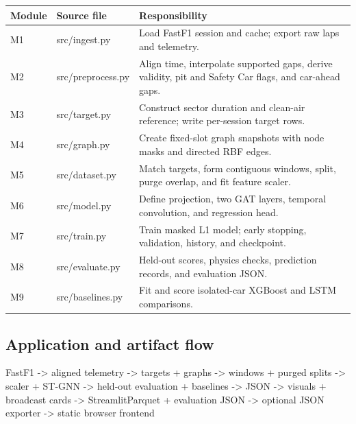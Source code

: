 \documentclass[11pt,a4paper,oneside]{report}
\begin{document}
\begin{center}\small\begin{tabularx}{\textwidth}{@{}>{\raggedright\arraybackslash}X>{\raggedright\arraybackslash}X>{\raggedright\arraybackslash}X@{}}

\toprule

Module & Source file & Responsibility \\

\midrule

M1 & src/ingest.py & Load FastF1 session and cache; export raw laps and telemetry. \\

M2 & src/preprocess.py & Align time, interpolate supported gaps, derive validity, pit and Safety Car flags, and car-ahead gaps. \\

M3 & src/target.py & Construct sector duration and clean-air reference; write per-session target rows. \\

M4 & src/graph.py & Create fixed-slot graph snapshots with node masks and directed RBF edges. \\

M5 & src/dataset.py & Match targets, form contiguous windows, split, purge overlap, and fit feature scaler. \\

M6 & src/model.py & Define projection, two GAT layers, temporal convolution, and regression head. \\

M7 & src/train.py & Train masked L1 model; early stopping, validation, history, and checkpoint. \\

M8 & src/evaluate.py & Held-out scores, physics checks, prediction records, and evaluation JSON. \\

M9 & src/baselines.py & Fit and score isolated-car XGBoost and LSTM comparisons. \\

\bottomrule\end{tabularx}\end{center}

\subsection*{Application and artifact flow}

FastF1 -> aligned telemetry -> targets + graphs       -> windows + purged splits -> scaler + ST-GNN       -> held-out evaluation + baselines -> JSON       -> visuals + broadcast cards -> StreamlitParquet + evaluation JSON -> optional JSON exporter                         -> static browser frontend
\end{document}
